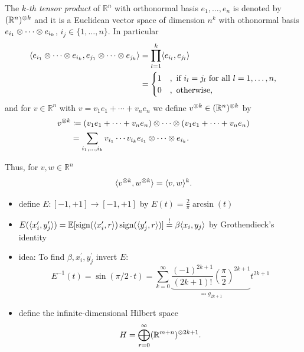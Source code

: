 	\begin{frame}
		\begin{definition}
			The \emph{$k$-th tensor product} of $\mathbb{R}^n$ with orthonormal basis $e_1,\dots,e_n$ is denoted by $(\mathbb{R}^n)^{\otimes k}$ and it is a Euclidean vector space of dimension $n^k$ with othonormal basis $e_{i_1}\otimes \cdots \otimes e_{i_k}$, $i_j\in\{1,\dots,n\}$. In particular 
			\begin{align}
				\langle{e_{i_1}\ensuremath{\otimes}\cdots \ensuremath{\otimes}e_{i_k}},{e_{j_1}\otimes \cdots \otimes e_{j_k}}\rangle
			&= \prod_{l=1}^k \langle{e_{i_l}},{e_{j_l}}\rangle\nonumber\\
			&=\begin{cases}
				1 & , \text{ if } i_l=j_l \text{ for all } l=1,\dots,n,\\
				0 & , \text{ otherwise},
			\end{cases} \label{eq:orthonormtensor}
			\end{align}
			and for $v\in\mathbb{R}^n$ with $v=v_1e_1+\cdots +v_ne_n$ we define $v^{\otimes k} \in (\mathbb{R}^n)^{\otimes k}$ by 
			\begin{align}
				v^{\otimes k} &\coloneqq (v_1e_1 + \cdots + v_ne_n) \otimes \cdots \otimes (v_1e_1 + \cdots + v_ne_n) \nonumber\\
				&= \sum_{i_1,\dots,i_k} v_{i_1}\cdots v_{i_k} e_{i_1}\otimes\cdots\otimes e_{i_k}.
			\end{align}	
		\end{definition}
		Thus, for $v,w\in\mathbb{R}^n$ 
		\begin{align}
			\langle{v^{\ensuremath{\otimes}k}},{w^{\otimes k}}\rangle
			= \langle{v},{w}\rangle^k. \label{eq:kth_tensor}
		\end{align}
	\end{frame}
	\begin{frame}
		\begin{pbmr}
			\begin{itemize}
				\item<1-> define $E: [-1,+1] \to [-1,+1]$ by $E(t)=\frac{2}{\pi}\arcsin(t)$
				\item<2-> $E(\langle{x_i^\prime},{y_j^\prime}\rangle ) = \mathbb{E}[\operatorname{sign}(\langle{x_i^\prime},{r}\rangle)\operatorname{sign}(\langle{y_j^\prime},{r}\rangle)] \overset{!}{=}\beta \langle{x_i},{y_j}\rangle$ by Grothendieck's identity
				\item<3-> idea: To find $\beta,x_i^\prime,y_j^\prime$ invert $E$:
					\[
						E^{-1}(t) = \sin(\pi/2 \cdot t) 
						= \sum_{k=0}^\infty \underbrace{\frac{(-1)^{2k+1}}{(2k+1)!}\left(\frac{\pi}{2}\right)^{2k+1}}_{\eqqcolon g_{2k+1}}  t^{2k+1}
					\]
				\item<4-> define the infinite-dimensional Hilbert space
					\begin{equation}
						H= \bigoplus_{r=0}^\infty (\mathbb{R}^{m+n})^{\otimes 2k+1}.
					\end{equation}
			\end{itemize}
		\end{pbmr}
	\end{frame}
